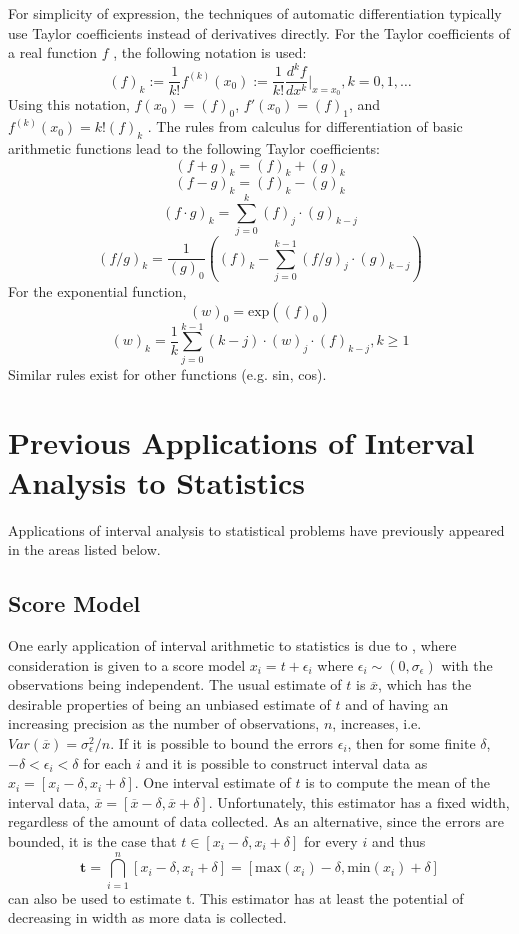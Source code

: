 For simplicity of expression, the techniques of automatic differentiation
typically use Taylor coefficients instead of derivatives directly. For the
Taylor coefficients of a real function $f$ , the following notation is used: 
$$
(f)_k := \frac{1}{k!} f^{(k)} (x_0 ) :=\frac{1}{k!}\frac{d^k f}{dx^k} |
_{x=x_0}, 
k = 0, 1, \ldots
$$
Using this notation, $f(x_0 ) = (f)_0$, $f'(x_0 ) = (f)_1$, and 
$f^{(k)} (x_0) = k!(f)_k $ . The rules from 
calculus for differentiation of basic arithmetic functions lead to the following Taylor 
coefficients: 
$$
(f + g)_k = (f)_k + (g)_k 
$$
$$
(f- g)_k = (f)_k - (g)_k 
$$
$$
(f \cdot g)_k = \sum_{j=0}^k (f)_j \cdot (g)_{k-j}
$$
$$
(f/g)_k = \frac{1}{(g)_0} \left((f)_k - \sum_{j=0}^{k-1}(f/g)_j \cdot (g)_{k-j}\right)
$$
For the exponential function, 
$$
(w)_0 = \mbox{exp}((f)_0 )
$$
$$ 
(w)_k = \frac{1}{k}\sum_{j=0}^{k-1} (k-j) \cdot (w)_j \cdot (f)_{k-j}, k \geq 1
$$
Similar rules exist for other functions (e.g. sin, cos). 

\section{Previous Applications of Interval Analysis to Statistics}

Applications of interval analysis to statistical problems have previously appeared in 
the areas listed below. 

\subsection{Score Model}

One early application of interval arithmetic to statistics is due to \cite{Walster88}, 
where consideration is given to a score model $x_i = t + \epsilon_i$ where 
$\epsilon_i \sim (0, \sigma_\epsilon)$ with the 
observations being independent. The usual estimate of $t$ is $\overline{x}$, 
which has the desirable 
properties of being an unbiased estimate of $t$ and of having an increasing precision as the number of observations, $n$, increases, i.e. $Var(\overline{x}) =
\sigma^2_\epsilon / n$. If it is possible to bound 
the errors $\epsilon_i$, then for some finite $\delta$, $-\delta < \epsilon_i
< \delta$ for each $i$ and it is possible to construct 
interval data as $x_i = [x_i -\delta, x_i + \delta]$. 
One interval estimate of $t$ is to compute the 
mean of the interval data, $\overline{x} = [\overline{x} -\delta, \overline{x} +
\delta]$.
Unfortunately, this estimator has a fixed 
width, regardless of the amount of data collected. As an alternative, since
the errors are  
bounded, it is the case that $t \in [x _i -\delta, x_i + \delta]$ for every
$i$ and thus 
$$
\mathbf{t} = \bigcap_{i=1}^n [ x_i - \delta, x_i + \delta] = [\mbox{max} (x_i) -
\delta, \mbox{min}(x_i) + \delta]
$$
can also be used to estimate t. This estimator has at least the potential of decreasing 
in width as more data is collected. 

